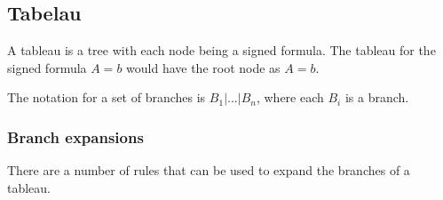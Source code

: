 \subsection{Tabelau}

A tableau is a tree with each node being a signed formula. The tableau for the
signed formula $A = b$ would have the root node as $A = b$.

The notation for a set of branches is $B_1 | ... | B_n$, where each $B_i$ is a
branch.

\subsubsection{Branch expansions}

There are a number of rules that can be used to expand the branches of a
tableau.
